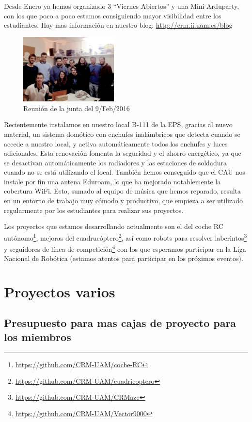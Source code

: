 \documentclass[12pt,twoside]{report}
\begin{document}
Desde Enero ya hemos organizado 3 ``Viernes Abiertos'' y una Mini-Arduparty, con los que poco a poco estamos consiguiendo mayor visibilidad entre los estudiantes. Hay mas información en nuestro blog: \url{http://crm.ii.uam.es/blog}

\begin{figure}
\centering
\includegraphics[width=0.44\textwidth]{fotosNuevas/acta9feb2016_b}
\caption*{Reunión de la junta del 9/Feb/2016}
\end{figure}

Recientemente instalamos en nuestro local B-111 de la EPS, gracias al nuevo material, un sistema domótico con enchufes inalámbricos que detecta cuando se accede a nuestro local, y activa automáticamente todos los enchufes y luces adicionales. Esta renovación fomenta la seguridad y el ahorro energético, ya que se desactivan automáticamente los radiadores y las estaciones de soldadura cuando no se está utilizando el local.
También hemos conseguido que el CAU nos instale por fin una antena Eduroam, lo que ha mejorado notablemente la cobertura WiFi. Esto, sumado al equipo de música que hemos reparado, resulta en un entorno de trabajo muy cómodo y productivo, que empieza a ser utilizado regularmente por los estudiantes para realizar sus proyectos.

Los proyectos que estamos desarrollando actualmente son el del coche RC autónomo\footnote{\url{https://github.com/CRM-UAM/coche-RC}}, 
mejoras del cuadrucóptero\footnote{\url{https://github.com/CRM-UAM/cuadricoptero}}, así como robots para resolver laberintos\footnote{\url{https://github.com/CRM-UAM/CRMaze}} y seguidores de línea de competición\footnote{\url{https://github.com/CRM-UAM/Vector9000}} con los que esperamos participar en la Liga Nacional de Robótica (estamos atentos para participar en los próximos eventos).


\section{Proyectos varios}

\subsection{Presupuesto para mas cajas de proyecto para los miembros}
\end{document}
